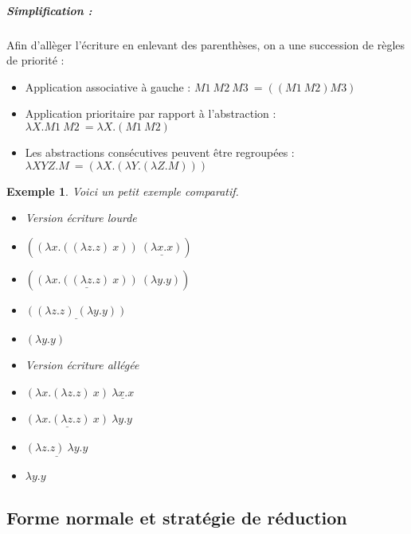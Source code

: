 \documentclass[10pt,a4paper]{report}
\newtheorem{ex}{Exemple}
\begin{document}
	
	\subparagraph{Simplification :} Afin d'allèger l'écriture en enlevant des parenthèses, on a une succession de règles de priorité :
	\begin{itemize}
		\item Application associative à gauche : $M1~M2~M3~= ((M1~M2)M3)$
		\item Application prioritaire par rapport à l'abstraction : $\lambda X.M1~M2~= \lambda X.(M1~M2)$
		\item Les abstractions consécutives peuvent être regroupées : $\lambda XYZ.M~= (\lambda X.(\lambda Y.(\lambda Z.M)))$
	\end{itemize}
	\medbreak
	
	\begin{ex}
		Voici un petit exemple comparatif.
		\begin{multicols}{2}{
				\begin{itemize}
					\item[] Version écriture lourde
					\item[] $((\lambda x.((\lambda z.z)~x))~\underline{(\lambda x.x)})$
					\item[$\rightarrow_{n}^{\alpha}$] $(\underline{(\lambda x.((\lambda z.z)~x))}~(\lambda y.y))$
					\item[$\rightarrow_{n}^{\eta}$] $\underline{((\lambda z.z)~(\lambda y.y))}$
					\item[$\rightarrow_{n}^{\beta}$] $(\lambda y.y)$
				\end{itemize}
				
				\begin{itemize}
					\item[] Version écriture allégée
					\item[] $(\lambda x.(\lambda z.z)~x)~\underline{\lambda x.x}$
					\item[$\rightarrow_{n}^{\alpha}$] $\underline{(\lambda x.(\lambda z.z)~x)}~\lambda y.y$
					\item[$\rightarrow_{n}^{\eta}$] $\underline{(\lambda z.z)~\lambda y.y}$
					\item[$\rightarrow_{n}^{\beta}$] $\lambda y.y$
				\end{itemize}
			}
		\end{multicols}
	\end{ex}
	\bigbreak
	
	
	\subsection{Forme normale et stratégie de réduction}
	
\end{document}
